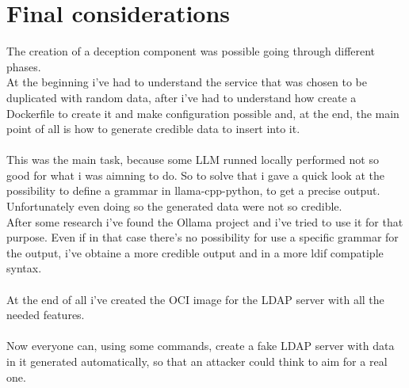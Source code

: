 \chapter{Final considerations}
The creation of a deception component was possible going through different phases.
\\
At the beginning i've had to understand the service that was chosen to be duplicated with random data, after i've had to understand how create a Dockerfile to create it and make configuration possible and, at the end, the main point of all is how to generate credible data to insert into it.
\\\\
This was the main task, because some LLM runned locally performed not so good for what i was aimning to do. So to solve that i gave a quick look at the possibility to define a grammar in llama-cpp-python, to get a precise output. Unfortunately even doing so the generated data were not so credible.
\\
After some research i've found the Ollama project and i've tried to use it for that purpose. Even if in that case there's no possibility for use a specific grammar for the output, i've obtaine a more credible output and in a more ldif compatiple syntax.
\\\\
At the end of all i've created the OCI image for the LDAP server with all the needed features.
\\\\
Now everyone can, using some commands, create a fake LDAP server with data in it generated automatically, so that an attacker could think to aim for a real one.
